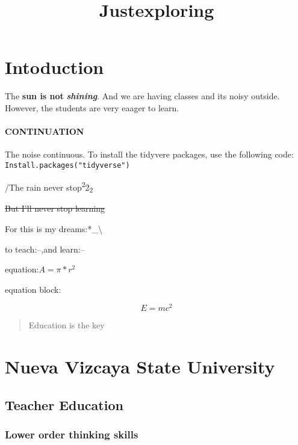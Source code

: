 \documentclass[
]{article}
\title{Justexploring}
\author{}
\date{\vspace{-2.5em}}
\begin{document}
\maketitle

\hypertarget{intoduction}{%
\section{Intoduction}\label{intoduction}}

The \textbf{sun is not} \textbf{\emph{shining}}. And we are having
classes and its noisy outside. However, the students are very eaager to
learn.

\hypertarget{continuation}{%
\paragraph{CONTINUATION}\label{continuation}}

The noise continuous. To install the tidyvere packages, use the
following code: \texttt{Install.packages("tidyverse")}

/The rain never stop\textsuperscript{2}2\textsubscript{2}

\sout{But I'll never stop learning}

For this is my dreams:*\_\textbackslash{}

to teach:--,and learn:--

equation:\(A=\pi*r^{2}\)

equation block:

\[E=mc^{2}\]

\begin{quote}
Education is the key
\end{quote}

\hypertarget{anchor}{%
\section{Nueva Vizcaya State University}\label{anchor}}

\hypertarget{ccs_id}{%
\subsection{Teacher Education}\label{ccs_id}}

\hypertarget{lower-order-thinking-skills}{%
\subsubsection{Lower order thinking
skills}\label{lower-order-thinking-skills}}
\end{document}
